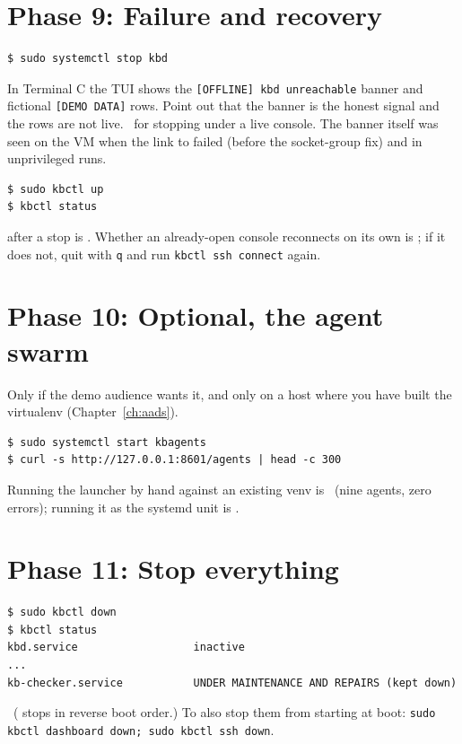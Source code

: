 \section{Phase 9: Failure and recovery}
\resetsteps
{}
\begin{lstlisting}[style=console]
$ sudo systemctl stop kbd
\end{lstlisting}
In Terminal C the TUI shows the \texttt{[OFFLINE] kbd unreachable} banner and fictional \texttt{[DEMO DATA]} rows. Point out that the banner is the
honest signal and the rows are not live. \notrun\ for stopping  under a live console. The banner itself was seen on the VM when the link to  failed (before the socket-group fix) and in unprivileged runs.
\begin{lstlisting}[style=console]
$ sudo kbctl up
$ kbctl status
\end{lstlisting}
 after a stop is \verified. Whether an already-open console reconnects on its own is \notrun; if it does not, quit with \texttt{q} and run \texttt{kbctl ssh connect} again.

\section{Phase 10: Optional, the agent swarm}
Only if the demo audience wants it, and only on a host where you have built the virtualenv (Chapter~\ref{ch:aads}).
\begin{lstlisting}[style=console]
$ sudo systemctl start kbagents
$ curl -s http://127.0.0.1:8601/agents | head -c 300
\end{lstlisting}
Running the launcher by hand against an existing venv is \verified\ (nine agents, zero errors); running it as the systemd unit is \notrun.

\section{Phase 11: Stop everything}
\begin{lstlisting}[style=console]
$ sudo kbctl down
$ kbctl status
kbd.service                  inactive
...
kb-checker.service           UNDER MAINTENANCE AND REPAIRS (kept down)
\end{lstlisting}
\verified\ ( stops in reverse boot order.) To also stop them from starting at boot:
\texttt{sudo kbctl dashboard down; sudo kbctl ssh down}.

